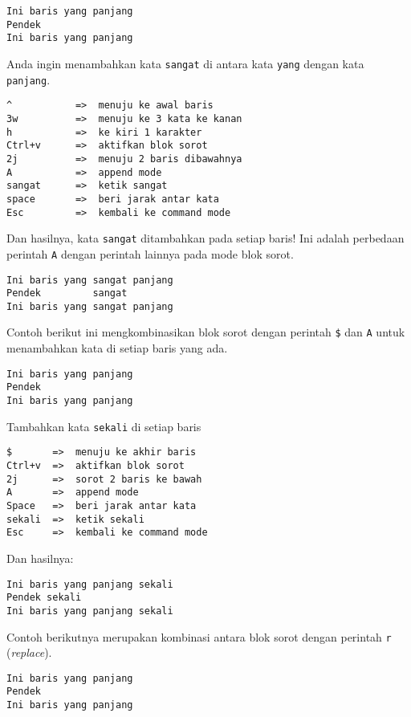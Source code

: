 \documentclass{article}
\begin{document}
\begin{verbatim}
Ini baris yang panjang
Pendek
Ini baris yang panjang
\end{verbatim}

Anda ingin menambahkan kata \verb=sangat= di antara kata
\verb=yang= dengan kata \verb=panjang=.

\begin{verbatim}
^           =>  menuju ke awal baris
3w          =>  menuju ke 3 kata ke kanan
h           =>  ke kiri 1 karakter
Ctrl+v      =>  aktifkan blok sorot
2j          =>  menuju 2 baris dibawahnya
A           =>  append mode
sangat      =>  ketik sangat
space       =>  beri jarak antar kata
Esc         =>  kembali ke command mode
\end{verbatim}

Dan hasilnya, kata \verb=sangat= ditambahkan pada setiap
baris! Ini adalah perbedaan perintah \verb=A= dengan
perintah lainnya pada mode blok sorot.

\begin{verbatim}
Ini baris yang sangat panjang
Pendek         sangat 
Ini baris yang sangat panjang
\end{verbatim}

Contoh berikut ini mengkombinasikan blok sorot dengan
perintah \verb=$= dan \verb=A= untuk menambahkan kata di
setiap baris yang ada.

\begin{verbatim}
Ini baris yang panjang
Pendek
Ini baris yang panjang
\end{verbatim}

Tambahkan kata \verb=sekali= di setiap baris

\begin{verbatim}
$       =>  menuju ke akhir baris
Ctrl+v  =>  aktifkan blok sorot
2j      =>  sorot 2 baris ke bawah
A       =>  append mode
Space   =>  beri jarak antar kata
sekali  =>  ketik sekali
Esc     =>  kembali ke command mode
\end{verbatim}

Dan hasilnya:

\begin{verbatim}
Ini baris yang panjang sekali
Pendek sekali
Ini baris yang panjang sekali
\end{verbatim}

Contoh berikutnya merupakan kombinasi antara blok sorot
dengan perintah \verb=r= (\emph{replace}).

\begin{verbatim}
Ini baris yang panjang
Pendek
Ini baris yang panjang
\end{verbatim}
\end{document}
